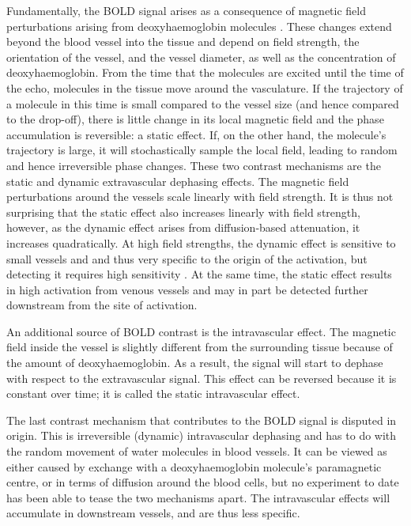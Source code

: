 Fundamentally, the BOLD signal arises as a consequence of magnetic field perturbations arising from deoxyhaemoglobin molecules \cite{Norris2006}. These changes extend beyond the blood vessel into the tissue and depend on field strength, the orientation of the vessel, and the vessel diameter, as well as the concentration of deoxyhaemoglobin. From the time that the molecules are excited until the time of the echo, molecules in the tissue move around the vasculature. If the trajectory of a molecule in this time is small compared to the vessel size (and hence compared to the drop-off), there is little change in its local magnetic field and the phase accumulation is reversible: a static effect. If, on the other hand, the molecule's trajectory is large, it will stochastically sample the local field, leading to random and hence irreversible phase changes. These two contrast mechanisms are the static and dynamic extravascular dephasing effects. The magnetic field perturbations around the vessels scale linearly with field strength. It is thus not surprising that the static effect also increases linearly with field strength, however, as the dynamic effect arises from diffusion-based attenuation, it increases quadratically.  At high field strengths, the dynamic effect is sensitive to small vessels and  and thus very specific to the origin of the activation, but detecting it requires high sensitivity \cite{Panchuelo2014}. At the same time, the static effect results in high activation from venous vessels and may in part be detected further downstream from the site of activation. 

An additional source of BOLD contrast is the intravascular effect. The magnetic field inside the vessel is slightly different from the surrounding tissue because of the amount of deoxyhaemoglobin. As a result, the signal will start to dephase with respect to the extravascular signal. This effect can be reversed because it is constant over time; it is called the static intravascular effect. 

The last contrast mechanism that contributes to the BOLD signal is disputed in origin. This is irreversible (dynamic) intravascular dephasing and has to do with the random movement of water molecules in blood vessels. It can be viewed as either caused by exchange with a deoxyhaemoglobin molecule's paramagnetic centre, or in terms of diffusion around the blood cells, but no experiment to date has been able to tease the two mechanisms apart. The intravascular effects will accumulate in downstream vessels,  and are thus less specific.

